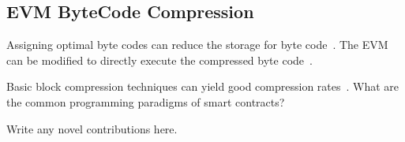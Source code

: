 
\subsection{EVM ByteCode Compression}\label{sec:evmcompress}

Assigning optimal byte codes can reduce the storage for byte code~\cite{aslam2010}.
The EVM can be modified to directly execute the compressed byte code~\cite{marc2003,evans2003}.

Basic block compression techniques can yield good compression rates~\cite{clausen2000}. 
What are the common programming paradigms of smart contracts?

Write any novel contributions here.

